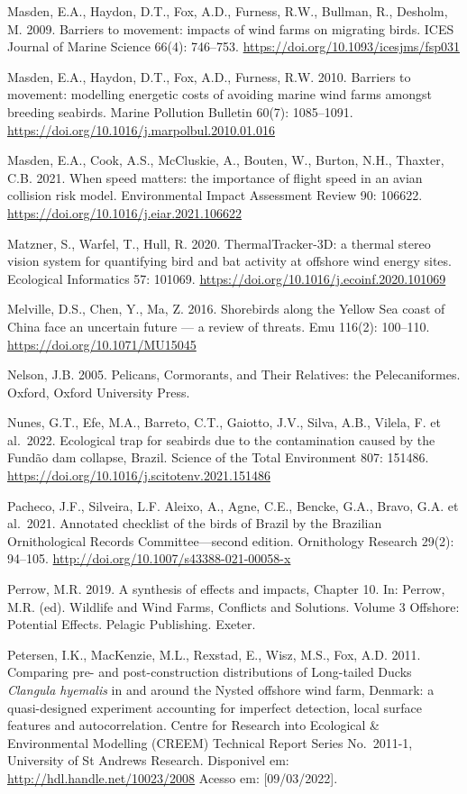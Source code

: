 \documentclass[
  oneside]{scrbook}
\begin{document}
Masden, E.A., Haydon, D.T., Fox, A.D., Furness, R.W., Bullman, R., Desholm, M. 2009. Barriers to movement: impacts of wind farms on migrating birds. ICES Journal of Marine Science 66(4): 746--753. \url{https://doi.org/10.1093/icesjms/fsp031}

Masden, E.A., Haydon, D.T., Fox, A.D., Furness, R.W. 2010. Barriers to movement: modelling energetic costs of avoiding marine wind farms amongst breeding seabirds. Marine Pollution Bulletin 60(7): 1085--1091. \url{https://doi.org/10.1016/j.marpolbul.2010.01.016}

Masden, E.A., Cook, A.S., McCluskie, A., Bouten, W., Burton, N.H., Thaxter, C.B. 2021. When speed matters: the importance of flight speed in an avian collision risk model. Environmental Impact Assessment Review 90: 106622. \url{https://doi.org/10.1016/j.eiar.2021.106622}

Matzner, S., Warfel, T., Hull, R. 2020. ThermalTracker-3D: a thermal stereo vision system for quantifying bird and bat activity at offshore wind energy sites. Ecological Informatics 57: 101069. \url{https://doi.org/10.1016/j.ecoinf.2020.101069}

Melville, D.S., Chen, Y., Ma, Z. 2016. Shorebirds along the Yellow Sea coast of China face an uncertain future --- a review of threats. Emu 116(2): 100--110. \url{https://doi.org/10.1071/MU15045}

Nelson, J.B. 2005. Pelicans, Cormorants, and Their Relatives: the Pelecaniformes. Oxford, Oxford University Press.

Nunes, G.T., Efe, M.A., Barreto, C.T., Gaiotto, J.V., Silva, A.B., Vilela, F. et al.~2022. Ecological trap for seabirds due to the contamination caused by the Fundão dam collapse, Brazil. Science of the Total Environment 807: 151486. \url{https://doi.org/10.1016/j.scitotenv.2021.151486}

Pacheco, J.F., Silveira, L.F. Aleixo, A., Agne, C.E., Bencke, G.A., Bravo, G.A. et al.~2021. Annotated checklist of the birds of Brazil by the Brazilian Ornithological Records Committee---second edition. Ornithology Research 29(2): 94--105. \url{http://doi.org/10.1007/s43388-021-00058-x}

Perrow, M.R. 2019. A synthesis of effects and impacts, Chapter 10. In: Perrow, M.R. (ed). Wildlife and Wind Farms, Conflicts and Solutions. Volume 3 Offshore: Potential Effects. Pelagic Publishing. Exeter.

Petersen, I.K., MacKenzie, M.L., Rexstad, E., Wisz, M.S., Fox, A.D. 2011. Comparing pre- and post-construction distributions of Long-tailed Ducks \emph{Clangula hyemalis} in and around the Nysted offshore wind farm, Denmark: a quasi-designed experiment accounting for imperfect detection, local surface features and autocorrelation. Centre for Research into Ecological \& Environmental Modelling (CREEM) Technical Report Series No.~2011-1, University of St Andrews Research. Disponivel em: \url{http://hdl.handle.net/10023/2008} Acesso em: {[}09/03/2022{]}.
\end{document}

